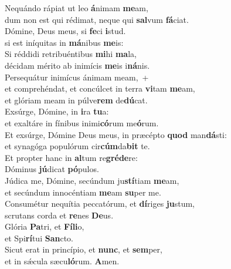 \evenverse Nequándo rápiat ut leo \textbf{á}nimam \textbf{me}am,~\*\\
\evenverse dum non est qui rédimat, neque qui \textbf{sal}vum \textbf{fá}ciat.\\
\oddverse Dómine, Deus meus, si \textbf{fe}ci \textbf{i}stud.~\*\\
\oddverse si est iníquitas in \textbf{má}nibus \textbf{me}is:\\
\evenverse Si réddidi retribuéntibus \textbf{mi}hi \textbf{ma}la,~\*\\
\evenverse décidam mérito ab inimícis \textbf{me}is i\textbf{ná}nis.\\
\oddverse Persequátur inimícus ánimam meam,~+\\
\oddverse  et comprehéndat, et concúlcet in terra \textbf{vi}tam \textbf{me}am,~\*\\
\oddverse et glóriam meam in púlve\textbf{rem} de\textbf{dú}cat.\\
\evenverse Exsúrge, Dómine, in \textbf{i}ra \textbf{tu}a:~\*\\
\evenverse et exaltáre in fínibus inimi\textbf{có}rum me\textbf{ó}rum.\\
\oddverse Et exsúrge, Dómine Deus meus, in præcépto \textbf{quod} man\textbf{dá}sti:~\*\\
\oddverse et synagóga populórum cir\textbf{cúm}da\textbf{bit} te.\\
\evenverse Et propter hanc in \textbf{al}tum re\textbf{gré}\textbf{de}re:~\*\\
\evenverse Dóminus \textbf{jú}dicat \textbf{pó}pulos.\\
\oddverse Júdica me, Dómine, secúndum ju\textbf{stí}tiam \textbf{me}am,~\*\\
\oddverse et secúndum innocéntiam \textbf{me}am \textbf{su}per me.\\
\evenverse Consumétur nequítia peccatórum, et \textbf{dí}riges \textbf{ju}stum,~\*\\
\evenverse scrutans corda et \textbf{re}nes \textbf{De}us.\\
\oddverse Glória \textbf{Pa}tri, et \textbf{Fí}\textbf{li}o,~\*\\
\oddverse et Spi\textbf{rí}tui \textbf{San}cto.\\
\evenverse Sicut erat in princípio, et \textbf{nunc}, et \textbf{sem}per,~\*\\
\evenverse et in sǽcula sæcu\textbf{ló}rum. \textbf{A}men.\\
